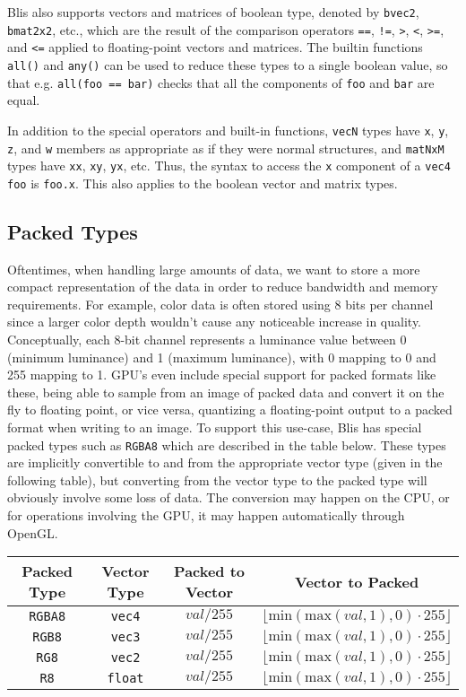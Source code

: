 \documentclass[11pt]{article}
\newcommand{\code}[1]{\texttt{#1}}
\begin{document}
Blis also supports vectors and matrices of boolean type, denoted by \code{bvec2}, \code{bmat2x2}, etc., which are the result of the comparison operators \code{==}, \code{!=}, \code{>}, \code{<}, \code{>=}, and \code{<=} applied to floating-point vectors and matrices. The builtin functions \code{all()} and \code{any()} can be used to reduce these types to a single boolean value, so that e.g. \code{all(foo == bar)} checks that all the components of \code{foo} and \code{bar} are equal.

In addition to the special operators and built-in functions, \code{vecN} types have \code{x}, \code{y}, \code{z}, and \code{w} members as appropriate as if they were normal structures, and \code{matNxM} types have \code{xx}, \code{xy}, \code{yx}, etc. Thus, the syntax to access the \code{x} component of a \code{vec4 foo} is \code{foo.x}. This also applies to the boolean vector and matrix types.

\subsection{Packed Types}

Oftentimes, when handling large amounts of data, we want to store a more compact representation of the data in order to reduce bandwidth and memory requirements. For example, color data is often stored using 8 bits per channel since a larger color depth wouldn't cause any noticeable increase in quality. Conceptually, each 8-bit channel represents a luminance value between 0 (minimum luminance) and 1 (maximum luminance), with 0 mapping to 0 and 255 mapping to 1. GPU's even include special support for packed formats like these, being able to sample from an image of packed data and convert it on the fly to floating point, or vice versa, quantizing a floating-point output to a packed format when writing to an image. To support this use-case, Blis has special packed types such as \code{RGBA8} which are described in the table below. These types are implicitly convertible to and from the appropriate vector type (given in the following table), but converting from the vector type to the packed type will obviously involve some loss of data. The conversion may happen on the CPU, or for operations involving the GPU, it may happen automatically through OpenGL.

\begin{tabular}{| c | c | c | c |}
\hline
Packed Type & Vector Type & Packed to Vector & Vector to Packed \\
\hline
\code{RGBA8} & \code{vec4} & $\textit{val} / 255$ & $ \lfloor \text{min}(\text{max}(\textit{val}, 1), 0) \cdot 255 \rfloor$ \\
\hline
\code{RGB8} & \code{vec3} & $\textit{val} / 255$ & $ \lfloor \text{min}(\text{max}(\textit{val}, 1), 0) \cdot 255 \rfloor$ \\
\hline
\code{RG8} & \code{vec2} & $\textit{val} / 255$ & $ \lfloor \text{min}(\text{max}(\textit{val}, 1), 0) \cdot 255 \rfloor$ \\
\hline
\code{R8} & \code{float} & $\textit{val} / 255$ & $ \lfloor \text{min}(\text{max}(\textit{val}, 1), 0) \cdot 255 \rfloor$ \\
\hline
\end{tabular}
\end{document}
